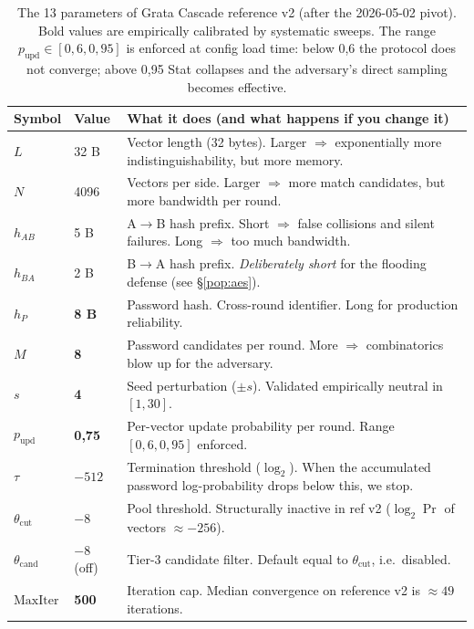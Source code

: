 \documentclass[11pt,a4paper]{article}
\begin{document}
\begin{table}[ht]
\centering
\small
\begin{tabular}{lll}
\toprule
Symbol & Value & What it does (and what happens if you change it) \\
\midrule
$L$ & 32 B & Vector length (32 bytes). Larger $\Rightarrow$ exponentially more indistinguishability, but more memory. \\
$N$ & 4096 & Vectors per side. Larger $\Rightarrow$ more match candidates, but more bandwidth per round. \\
$h_{AB}$ & 5 B & A$\to$B hash prefix. Short $\Rightarrow$ false collisions and silent failures. Long $\Rightarrow$ too much bandwidth. \\
$h_{BA}$ & 2 B & B$\to$A hash prefix. \emph{Deliberately short} for the flooding defense (see §\ref{pop:aes}). \\
$h_P$ & \textbf{8 B} & Password hash. Cross-round identifier. Long for production reliability. \\
$M$ & \textbf{8} & Password candidates per round. More $\Rightarrow$ combinatorics blow up for the adversary. \\
$s$ & \textbf{4} & Seed perturbation ($\pm s$). Validated empirically neutral in $[1, 30]$. \\
$p_\text{upd}$ & \textbf{0{,}75} & Per-vector update probability per round. Range $[0{,}6, 0{,}95]$ enforced. \\
$\tau$ & $-512$ & Termination threshold ($\log_2$). When the accumulated password log-probability drops below this, we stop. \\
$\theta_\text{cut}$ & $-8$ & Pool threshold. Structurally inactive in ref v2 ($\log_2 \Pr$ of vectors $\approx -256$). \\
$\theta_\text{cand}$ & \textbf{$-8$} (off) & Tier-3 candidate filter. Default equal to $\theta_\text{cut}$, i.e.\ disabled. \\
$\text{MaxIter}$ & \textbf{500} & Iteration cap. Median convergence on reference v2 is $\approx 49$ iterations. \\
\bottomrule
\end{tabular}
\caption{The 13 parameters of Grata Cascade reference v2 (after the 2026-05-02 pivot). Bold values are empirically calibrated by systematic sweeps. The range $p_\text{upd} \in [0{,}6, 0{,}95]$ is enforced at config load time: below 0{,}6 the protocol does not converge; above 0{,}95 Stat collapses and the adversary's direct sampling becomes effective.}
\label{tab:pop-params}
\end{table}
\end{document}

